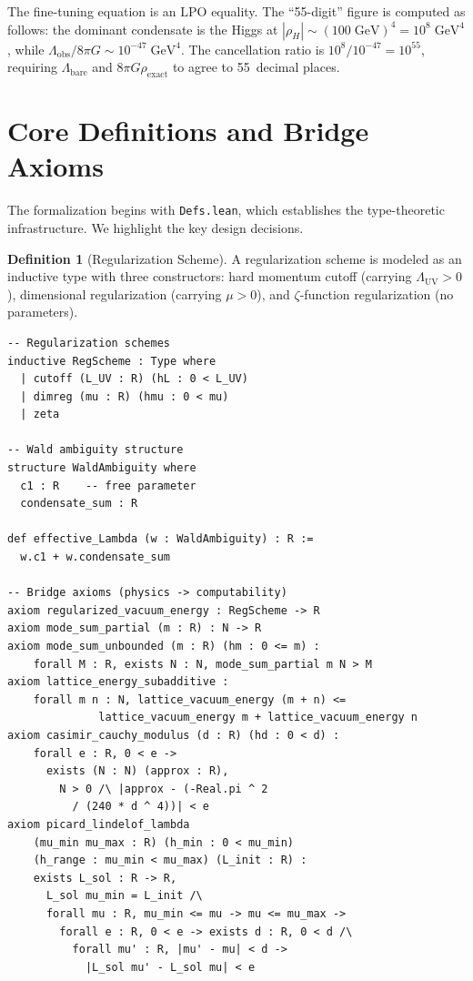 \documentclass[11pt,a4paper]{article}
\theoremstyle{plain}
\theoremstyle{definition}
\newtheorem{definition}[theorem]{Definition}
\newcommand{\LPO}{\ensuremath{\mathrm{LPO}}}
\newcommand{\Lobs}{\Lambda_{\mathrm{obs}}}
\newcommand{\Lbare}{\Lambda_{\mathrm{bare}}}
\begin{document}
The fine-tuning equation is an $\LPO$ equality.
The ``55-digit'' figure is computed as follows:
the dominant condensate is the Higgs at $|\rho_H| \sim (100\;\mathrm{GeV})^4
= 10^8\;\mathrm{GeV}^4$, while $\Lobs/8\pi G \sim 10^{-47}\;\mathrm{GeV}^4$.
The cancellation ratio is $10^8/10^{-47} = 10^{55}$, requiring
$\Lbare$ and $8\pi G \rho_{\mathrm{exact}}$ to agree to 55~decimal places.

\section{Core Definitions and Bridge Axioms}\label{sec:defs}

The formalization begins with \texttt{Defs.lean}, which establishes
the type-theoretic infrastructure.  We highlight the key design decisions.

\begin{definition}[Regularization Scheme]\label{def:regscheme}
A regularization scheme is modeled as an inductive type with three
constructors: hard momentum cutoff (carrying $\Lambda_{\mathrm{UV}} > 0$),
dimensional regularization (carrying $\mu > 0$), and $\zeta$-function
regularization (no parameters).
\end{definition}

\begin{lstlisting}[caption={Core types: \texttt{Defs.lean} (excerpts)}]
-- Regularization schemes
inductive RegScheme : Type where
  | cutoff (L_UV : R) (hL : 0 < L_UV)
  | dimreg (mu : R) (hmu : 0 < mu)
  | zeta

-- Wald ambiguity structure
structure WaldAmbiguity where
  c1 : R    -- free parameter
  condensate_sum : R

def effective_Lambda (w : WaldAmbiguity) : R :=
  w.c1 + w.condensate_sum

-- Bridge axioms (physics -> computability)
axiom regularized_vacuum_energy : RegScheme -> R
axiom mode_sum_partial (m : R) : N -> R
axiom mode_sum_unbounded (m : R) (hm : 0 <= m) :
    forall M : R, exists N : N, mode_sum_partial m N > M
axiom lattice_energy_subadditive :
    forall m n : N, lattice_vacuum_energy (m + n) <=
              lattice_vacuum_energy m + lattice_vacuum_energy n
axiom casimir_cauchy_modulus (d : R) (hd : 0 < d) :
    forall e : R, 0 < e ->
      exists (N : N) (approx : R),
        N > 0 /\ |approx - (-Real.pi ^ 2
          / (240 * d ^ 4))| < e
axiom picard_lindelof_lambda
    (mu_min mu_max : R) (h_min : 0 < mu_min)
    (h_range : mu_min < mu_max) (L_init : R) :
    exists L_sol : R -> R,
      L_sol mu_min = L_init /\
      forall mu : R, mu_min <= mu -> mu <= mu_max ->
        forall e : R, 0 < e -> exists d : R, 0 < d /\
          forall mu' : R, |mu' - mu| < d ->
            |L_sol mu' - L_sol mu| < e
\end{lstlisting}
\end{document}

